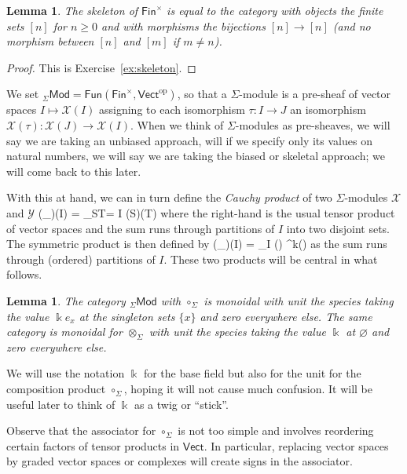 \documentclass[fleqn, a4paper, twoside]{article}
\makeatletter
\newcommand{\0}{\langle 0\rangle}
\newcommand{\XX}{\mathcal{X}}
\newcommand{\YY}{\mathcal{Y}}
\let\[\@undefined
\DeclareRobustCommand{\[}{\begin{equation}}%
\let\]\@undefined
\DeclareRobustCommand{\]}{\end{equation}}%
\theoremstyle{mytheorem}
\newtheorem{lemma}[theorem]{Lemma}
\theoremstyle{introthm}
\theoremstyle{mydefinition}
\theoremstyle{mydefinition2}
\theoremstyle{plain} %
\newcommand{\GSet}{\mathsf{Fin}^\times}
\newcommand{\Fun}{\mathsf{Fun}}
\newcommand{\Mod}{\mathsf{Mod}}
\newcommand{\?}{\,?\,}
\newcommand{\kk}{\Bbbk}
\theoremstyle{mytheorem}
\theoremstyle{plain} %
\makeatother
\begin{document}
\begin{lemma} The skeleton of $\GSet$ is
equal to the category with objects the finite sets
$[n]$ for $n\geqslant 0$ and with morphisms the
bijections $[n]\longrightarrow [n]$ (and no morphism
between $[n]$ and $[m]$ if $m\neq n$).
\end{lemma}

\begin{proof}
This is Exercise~\ref{ex:skeleton}.
\end{proof}

We set ${}_\Sigma\Mod  = 
\Fun(\GSet,\mathsf{Vect}^{\mathrm{op}})$,
so that a $\Sigma$-module is a pre-sheaf of vector
spaces $I\longmapsto \XX(I)$ assigning to each
isomorphism $\tau : I\longrightarrow J$ an isomorphism
$\XX(\tau): \XX(J)\longrightarrow \XX(I)$. When we
think of $\Sigma$-modules as pre-sheaves, we will say we 
are taking an unbiased approach, will if we specify only
its values on natural numbers, we will say we are taking the
biased or skeletal approach; we will come back to this later.

With this at hand, 
we can in turn define the \emph{Cauchy product}
of two $\Sigma$-modules $\XX$ and $\YY$
\[ (\XX\otimes_\Sigma \YY)(I) = 
 	\bigoplus_{S\sqcup T= I}
 		 \XX(S)\otimes \YY(T)\] 
where the right-hand is the usual tensor product of
vector spaces
and the sum runs through partitions of $I$ into
two disjoint sets. The symmetric product is then
defined by 
\[ (\XX\circ_\Sigma \YY)(I) 
 	= \bigoplus_{\pi \vdash I} \XX(\pi) 
 		\otimes \YY^{\otimes k}(\pi)\] 
as the sum runs through (ordered) partitions of $I$.
These two products will be central in what follows.

\begin{lemma}
The category ${}_\Sigma\Mod$ with $\circ_\Sigma$ is
monoidal with unit the species taking the value $\kk e_x$ at 
the singleton sets $\{x\}$ and zero everywhere else. The same
category is monoidal for $\otimes_\Sigma$ with unit
the species taking the value $\kk$ at $\varnothing$
and zero everywhere else.
\end{lemma}

We will use the notation $\kk$ for the base field but
also for the unit for the composition product $\circ_\Sigma$,
hoping it will not cause much confusion. It will be useful 
later to think of $\kk$ as a twig or ``stick''.

Observe that the associator for $\circ_\Sigma$ is
not too simple and involves reordering certain
factors of tensor products in $\mathsf{Vect}$. In
particular, replacing vector spaces by graded vector
spaces or complexes will create signs in the
associator.
\end{document}
